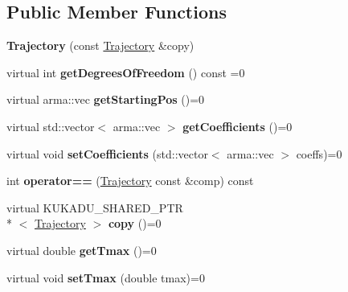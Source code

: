 \subsection*{Public Member Functions}
\begin{DoxyCompactItemize}
\item 
\hypertarget{classkukadu_1_1Trajectory_a9546cb13ba9d3e4731af50033c54caf7}{{\bfseries Trajectory} (const \hyperlink{classkukadu_1_1Trajectory}{Trajectory} \&copy)}\label{classkukadu_1_1Trajectory_a9546cb13ba9d3e4731af50033c54caf7}

\item 
\hypertarget{classkukadu_1_1Trajectory_ac3bfd744d4afb90f67afd7c0208192fb}{virtual int {\bfseries get\-Degrees\-Of\-Freedom} () const =0}\label{classkukadu_1_1Trajectory_ac3bfd744d4afb90f67afd7c0208192fb}

\item 
\hypertarget{classkukadu_1_1Trajectory_a28ee5ea908f0f5b236a986dc0d97e8eb}{virtual arma\-::vec {\bfseries get\-Starting\-Pos} ()=0}\label{classkukadu_1_1Trajectory_a28ee5ea908f0f5b236a986dc0d97e8eb}

\item 
\hypertarget{classkukadu_1_1Trajectory_a352b19fcc831bc578170b21e33e131af}{virtual std\-::vector$<$ arma\-::vec $>$ {\bfseries get\-Coefficients} ()=0}\label{classkukadu_1_1Trajectory_a352b19fcc831bc578170b21e33e131af}

\item 
\hypertarget{classkukadu_1_1Trajectory_a4cf44e29c98bca578f901720fc4931ff}{virtual void {\bfseries set\-Coefficients} (std\-::vector$<$ arma\-::vec $>$ coeffs)=0}\label{classkukadu_1_1Trajectory_a4cf44e29c98bca578f901720fc4931ff}

\item 
\hypertarget{classkukadu_1_1Trajectory_a19baa2586084c301987a940a3d8bbf10}{int {\bfseries operator==} (\hyperlink{classkukadu_1_1Trajectory}{Trajectory} const \&comp) const }\label{classkukadu_1_1Trajectory_a19baa2586084c301987a940a3d8bbf10}

\item 
\hypertarget{classkukadu_1_1Trajectory_ac90ea1213d1888c4f7d7f9b41e9eb386}{virtual K\-U\-K\-A\-D\-U\-\_\-\-S\-H\-A\-R\-E\-D\-\_\-\-P\-T\-R\\*
$<$ \hyperlink{classkukadu_1_1Trajectory}{Trajectory} $>$ {\bfseries copy} ()=0}\label{classkukadu_1_1Trajectory_ac90ea1213d1888c4f7d7f9b41e9eb386}

\item 
\hypertarget{classkukadu_1_1Trajectory_a6204d020bea77db78f1ea15bdd6c00e3}{virtual double {\bfseries get\-Tmax} ()=0}\label{classkukadu_1_1Trajectory_a6204d020bea77db78f1ea15bdd6c00e3}

\item 
\hypertarget{classkukadu_1_1Trajectory_a88078ae380944edb6256976a9b7c31e3}{virtual void {\bfseries set\-Tmax} (double tmax)=0}\label{classkukadu_1_1Trajectory_a88078ae380944edb6256976a9b7c31e3}

\end{DoxyCompactItemize}


